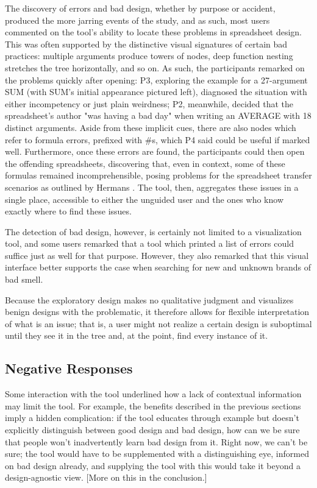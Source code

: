 \documentclass[conference]{IEEEtran}
\begin{document}
	The discovery of errors and bad design, whether by purpose or accident,
	produced the more jarring events of the study, and as such, most users
	commented on the tool's ability to locate these problems in spreadsheet design.
	This was often supported by the distinctive visual signatures of certain bad
	practices: multiple arguments produce towers of nodes, deep function nesting
	stretches the tree horizontally, and so on. As such, the participants remarked
	on the problems quickly after opening: P3, exploring the example for a
	27-argument SUM (with SUM's initial appearance pictured left), diagnosed the
	situation with either incompetency or just plain weirdness; P2, meanwhile,
	decided that the spreadsheet's author "was having a bad day" when writing an
	AVERAGE with 18 distinct arguments. Aside from these implicit cues, there are
	also nodes which refer to formula errors, prefixed with \#s, which P4 said
	could be useful if marked well. Furthermore, once these errors are found, the
	participants could then open the offending spreadsheets, discovering that, even
	in context, some of these formulas remained incomprehensible, posing problems
	for the spreadsheet transfer scenarios as outlined by Hermans
	\cite{hermans2011supporting}. The tool, then, aggregates these issues in a
	single place, accessible to either the unguided user and the ones who know
	exactly where to find these issues. \par
	
	The detection of bad design, however, is certainly not limited to a
	visualization tool, and some users remarked that a tool which printed a list of
	errors could suffice just as well for that purpose. However, they also remarked
	that this visual interface better supports the case when searching for new and
	unknown brands of bad smell.
	
	Because the exploratory design makes no qualitative judgment and visualizes
	benign designs with the problematic, it therefore allows for flexible
	interpretation of what is an issue; that is, a user might not realize a certain
	design is suboptimal until they see it in the tree and, at the point, find
	every instance of it.
	
	\subsection{Negative Responses} Some interaction with the tool underlined how a
	lack of contextual information may limit the tool. For example, the benefits
	described in the previous sections imply a hidden complication: if the tool
	educates through example but doesn't explicitly distinguish between good design
	and bad design, how can we be sure that people won't inadvertently learn bad
	design from it. Right now, we can't be sure; the tool would have to be
	supplemented with a distinguishing eye, informed on bad design already, and
	supplying the tool with this would take it beyond a design-agnostic view. [More
	on this in the conclusion.] \par
	
\end{document}

